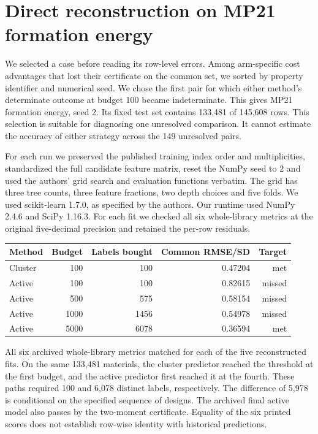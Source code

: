 \section{Direct reconstruction on MP21 formation energy}
We selected a case before reading its row-level errors. Among arm-specific cost advantages that lost their certificate on the common set, we sorted by property identifier and numerical seed. We chose the first pair for which either method's determinate outcome at budget 100 became indeterminate. This gives MP21 formation energy, seed 2. Its fixed test set contains 133,481 of 145,608 rows. This selection is suitable for diagnosing one unresolved comparison. It cannot estimate the accuracy of either strategy across the 149 unresolved pairs.

For each run we preserved the published training index order and multiplicities, standardized the full candidate feature matrix, reset the NumPy seed to 2 and used the authors' grid search and evaluation functions verbatim. The grid has three tree counts, three feature fractions, two depth choices and five folds. We used scikit-learn 1.7.0, as specified by the authors. Our runtime used NumPy 2.4.6 and SciPy 1.16.3. For each fit we checked all six whole-library metrics at the original five-decimal precision and retained the per-row residuals.

\begin{center}
\begin{tabular}{@{}lrrrr@{}}
\toprule
Method & Budget & Labels bought & Common RMSE/SD & Target\\
\midrule
Cluster & 100 & 100 & 0.47204 & met\\
Active & 100 & 100 & 0.82615 & missed\\
Active & 500 & 575 & 0.58154 & missed\\
Active & 1000 & 1456 & 0.54978 & missed\\
Active & 5000 & 6078 & 0.36594 & met\\
\bottomrule
\end{tabular}
\end{center}
All six archived whole-library metrics matched for each of the five reconstructed fits. On the same 133,481 materials, the cluster predictor reached the threshold at the first budget, and the active predictor first reached it at the fourth. These paths required 100 and 6,078 distinct labels, respectively. The difference of 5,978 is conditional on the specified sequence of designs. The archived final active model also passes by the two-moment certificate. Equality of the six printed scores does not establish row-wise identity with historical predictions.
